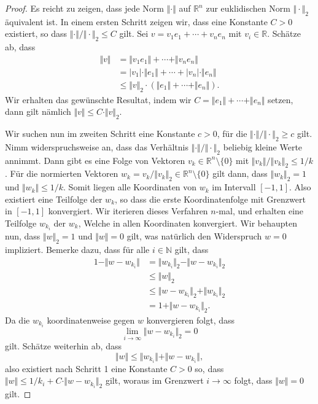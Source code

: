 \documentclass[../main.tex]{subfiles}
\begin{document}
\begin{proof}
  Es reicht zu zeigen, dass jede Norm
  $\Vert \cdot \Vert$ auf $\mathbb{R}^{n}$ 
  zur euklidischen Norm $\Vert \cdot \Vert_2$ 
  äquivalent ist.
  In einem ersten Schritt zeigen wir, dass
  eine Konstante $C > 0$ existiert, so dass
  $\Vert \cdot \Vert / \Vert \cdot \Vert_2 \leq C$
  gilt.
  Sei $v = v_1 e_1 +\cdots + v_n e_n$ mit $v_i \in \mathbb{R}$.
  Schätze ab, dass
  \begin{align*}
    \Vert v \Vert 
    &= \Vert v_1 e_1 \Vert + \cdots + \Vert v_n e_n \Vert \\
    &= |v_1| \cdot \Vert e_1 \Vert + \cdots + |v_n| \cdot \Vert e_n \Vert \\
    &\leq \Vert v \Vert_2 \cdot (\Vert e_1 \Vert + \cdots + \Vert e_n \Vert).
  \end{align*}
  Wir erhalten das gewünschte Resultat, indem wir
  $C = \Vert e_1 \Vert + \cdots + \Vert e_n \Vert$ setzen,
  dann gilt nämlich $\Vert v \Vert \leq C \cdot \Vert v \Vert_2$.

  Wir suchen nun im zweiten Schritt
  eine Konstante $c > 0$, für die $\Vert \cdot \Vert / \Vert \cdot \Vert_2
  \geq c$ gilt.
  Nimm widerspruchsweise an, dass das Verhältnis $\Vert \cdot \Vert /
  \Vert \cdot \Vert_2$ beliebig kleine Werte annimmt.
  Dann gibt es eine Folge von Vektoren
  $v_k \in \mathbb{R}^n \setminus \{0\}$ mit
  $\Vert v_k \Vert / \Vert v_k \Vert_2 \leq 1/k$.
  Für die normierten Vektoren $w_k = v_k / \Vert v_k \Vert_2
  \in \mathbb{R}^n \setminus \{0\}$ 
  gilt dann, dass $\Vert w_k \Vert_2 = 1$ 
  und $\Vert w_k \Vert \leq 1/k$.
  Somit liegen alle Koordinaten von $w_k$ 
  im Intervall $[-1, 1]$.
  Also existiert eine Teilfolge
  der $w_k$, so dass die erste Koordinatenfolge
  mit Grenzwert in $[-1, 1]$ konvergiert.
  Wir iterieren dieses Verfahren $n$-mal,
  und erhalten eine Teilfolge $w_{k_i}$ der $w_k$,
  Welche in allen Koordinaten konvergiert.
  Wir behaupten nun, dass $\Vert w \Vert_2 = 1$ 
  und $\Vert w \Vert = 0$ gilt, was
  natürlich den Widerspruch $w = 0$ impliziert.
  Bemerke dazu, dass für alle $i \in \mathbb{N}$ 
  gilt, dass
  \begin{align*}
     1 - \Vert w - w_{k_i} \Vert
     &= \Vert w_{k_i} \Vert_2 - \Vert w - w_{k_i} \Vert_2  \\
     &\leq \Vert w \Vert_2 \\
     &\leq \Vert w - w_{k_i} \Vert_2 + \Vert w_{k_i} \Vert_2 \\
    &= 1 + \Vert w - w_{k_i} \Vert_2.
  \end{align*}
  Da die $w_{k_i}$ koordinatenweise gegen $w$ konvergieren folgt, dass
  \[
    \lim_{i \to \infty} \Vert w - w_{k_i}\Vert_2 = 0
  \]
  gilt. Schätze weiterhin ab, dass
  \[
     \Vert w \Vert
     \leq \Vert w_{k_i} \Vert + \Vert w - w_{k_i} \Vert ,
  \]
  also existiert nach Schritt 1 eine Konstante
  $C > 0$ so, dass $\Vert w \Vert \leq 1/k_i + C \cdot
  \Vert w - w_{k_i} \Vert_2$
  gilt, woraus im Grenzwert $i \to \infty$ folgt,
  dass $\Vert w \Vert = 0$ gilt.
\end{proof}
\end{document}
